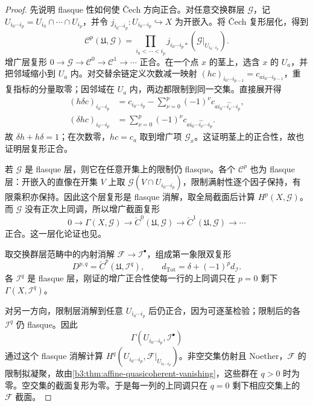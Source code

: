 \begin{proof}
	先说明 flasque 性如何使 Čech 方向正合。对任意交换群层 \(\mathcal G\)，记 \(U_{i_0\cdots i_p}=U_{i_0}\cap\cdots\cap U_{i_p}\)，并令 \(j_{i_0\cdots i_p}:U_{i_0\cdots i_p}\hookrightarrow X\) 为开嵌入。将 Čech 复形层化，得到
	\[
		\mathscr C^p(\mathfrak U,\mathcal G) =\prod_{i_0<\cdots<i_p} j_{i_0\cdots i_p*}(\mathcal G|_{U_{i_0\cdots i_p}}).
	\]
	增广层复形 \(0\to\mathcal G\to\mathscr C^0\to\mathscr C^1\to\cdots\) 正合。在一个点 \(x\) 的茎上，选含 \(x\) 的 \(U_a\)，并把邻域缩小到 \(U_a\) 内。对交替余链定义次数减一映射 \((hc)_{i_0\cdots i_{p-1}}=c_{a i_0\cdots i_{p-1}}\)，重复指标的分量取零；因邻域在 \(U_a\) 内，两边都限制到同一交集。直接展开得
	\[
		\begin{aligned}
			(h\delta c)_{i_0\cdots i_p} &=c_{i_0\cdots i_p}-\sum_{\nu=0}^p(-1)^\nu c_{a i_0\cdots\widehat{i_\nu}\cdots i_p},\\
			(\delta hc)_{i_0\cdots i_p} &=\sum_{\nu=0}^p(-1)^\nu c_{a i_0\cdots\widehat{i_\nu}\cdots i_p}.
		\end{aligned}
	\]
	故 \(\delta h+h\delta=1\)；在次数零，\(hc=c_a\) 取到增广项 \(\mathcal G_x\)。这证明茎上的正合性，故也证明层复形正合。

	若 \(\mathcal G\) 是 flasque 层，则它在任意开集上的限制仍 flasque。各个 \(\mathscr C^p\) 也为 flasque 层：开嵌入的直像在开集 \(V\) 上取 \(\mathcal G(V\cap U_{i_0\cdots i_p})\)，限制满射性逐个因子保持，有限乘积亦保持。因此这个层复形是 flasque 消解，取全局截面后计算 \(H^p(X,\mathcal G)\)。而 \(\mathcal G\) 没有正次上同调，所以增广截面复形
	\[
		0\to\Gamma(X,\mathcal G)\to \check C^0(\mathfrak U,\mathcal G)\to \check C^1(\mathfrak U,\mathcal G)\to\cdots
	\]
	正合。这一层化论证也见\cite[Chapter III, Lemma 4.2 and Proposition 4.3, pp. 220--221]{Hartshorne1977}。

	取交换群层范畴中的内射消解 \(\mathcal F\to\mathcal I^\bullet\)，组成第一象限双复形
	\[
		D^{p,q}=\check C^p(\mathfrak U,\mathcal I^q), \qquad d_{\mathrm{Tot}}=\delta+(-1)^p d_{\mathcal I}.
	\]
	各 \(\mathcal I^q\) 是 flasque 层，刚证的增广正合性使每一行的上同调只在 \(p=0\) 剩下 \(\Gamma(X,\mathcal I^q)\)。

	对另一方向，限制层消解到任意 \(U_{i_0\cdots i_p}\) 后仍正合，因为可逐茎检验；限制后的各 \(\mathcal I^q\) 仍 flasque。因此
	\[
		\Gamma(U_{i_0\cdots i_p},\mathcal I^\bullet)
	\]
	通过这个 flasque 消解计算 \(H^q(U_{i_0\cdots i_p},\mathcal F|_{U_{i_0\cdots i_p}})\)。非空交集仿射且 Noether，\(\mathcal F\) 的限制拟凝聚，故由\cref{b3:thm:affine-quasicoherent-vanishing}，这些群在 \(q>0\) 时为零。空交集的截面复形为零。于是每一列的上同调只在 \(q=0\) 剩下相应交集上的 \(\mathcal F\) 截面。


\end{proof}
